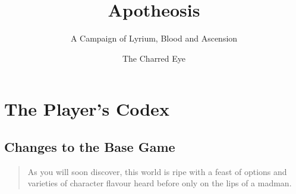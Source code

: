 \documentclass{apotheosis-book} %
\title{Apotheosis}
\subtitle{A Campaign of Lyrium, Blood and Ascension}
\author{The Charred Eye}
\begin{document}
\maketitle
\makecredits
\tableofcontents

\part{The Player's Codex}

\chapter{Changes to the Base Game}

\begin{quote}
  As you will soon discover, this world is ripe with a feast of options and
  varieties of character flavour heard before only on the lips of a madman.
\end{quote}
\end{document}
